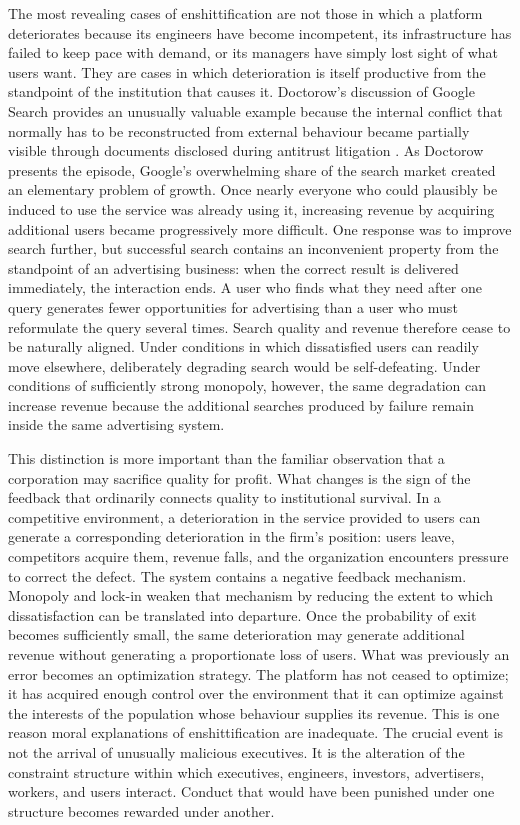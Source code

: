 \documentclass[11pt]{article}
\begin{document}
The most revealing cases of enshittification are not those in which a platform deteriorates because its engineers have become incompetent, its infrastructure has failed to keep pace with demand, or its managers have simply lost sight of what users want. They are cases in which deterioration is itself productive from the standpoint of the institution that causes it. Doctorow's discussion of Google Search \parencite{doctorowfox2026} provides an unusually valuable example because the internal conflict that normally has to be reconstructed from external behaviour became partially visible through documents disclosed during antitrust litigation \parencite{usgoogleantitrust2024,googlequalityrevenue}. As Doctorow presents the episode, Google's overwhelming share of the search market created an elementary problem of growth. Once nearly everyone who could plausibly be induced to use the service was already using it, increasing revenue by acquiring additional users became progressively more difficult. One response was to improve search further, but successful search contains an inconvenient property from the standpoint of an advertising business: when the correct result is delivered immediately, the interaction ends. A user who finds what they need after one query generates fewer opportunities for advertising than a user who must reformulate the query several times. Search quality and revenue therefore cease to be naturally aligned. Under conditions in which dissatisfied users can readily move elsewhere, deliberately degrading search would be self-defeating. Under conditions of sufficiently strong monopoly, however, the same degradation can increase revenue because the additional searches produced by failure remain inside the same advertising system.

This distinction is more important than the familiar observation that a corporation may sacrifice quality for profit. What changes is the sign of the feedback that ordinarily connects quality to institutional survival. In a competitive environment, a deterioration in the service provided to users can generate a corresponding deterioration in the firm's position: users leave, competitors acquire them, revenue falls, and the organization encounters pressure to correct the defect. The system contains a negative feedback mechanism. Monopoly and lock-in weaken that mechanism by reducing the extent to which dissatisfaction can be translated into departure. Once the probability of exit becomes sufficiently small, the same deterioration may generate additional revenue without generating a proportionate loss of users. What was previously an error becomes an optimization strategy. The platform has not ceased to optimize; it has acquired enough control over the environment that it can optimize against the interests of the population whose behaviour supplies its revenue. This is one reason moral explanations of enshittification are inadequate. The crucial event is not the arrival of unusually malicious executives. It is the alteration of the constraint structure within which executives, engineers, investors, advertisers, workers, and users interact. Conduct that would have been punished under one structure becomes rewarded under another.
\end{document}
